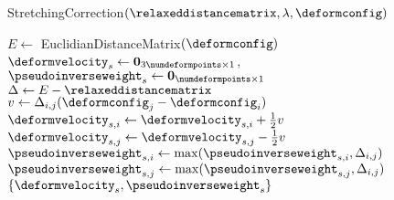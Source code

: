 \begin{algorithm}[t]
    \caption{StretchingCorrection$(\relaxeddistancematrix, \lambda, \deformconfig)$}
    \begin{algorithmic}[1]
        \State $E \gets$ EuclidianDistanceMatrix$(\deformconfig)$
        \State $\deformvelocity_s \gets \boldsymbol 0_{3\numdeformpoints \times 1}$, $\pseudoinverseweight_s \gets \boldsymbol 0_{\numdeformpoints \times 1}$
        \State $\Delta \gets E - \relaxeddistancematrix$
                    \State $v \gets \Delta_{i,j}(\deformconfig_j - \deformconfig_i)$
                    \State $\deformvelocity_{s,i} \gets \deformvelocity_{s,i} + \frac{1}{2}v$
                    \State $\deformvelocity_{s,j} \gets \deformvelocity_{s,j} - \frac{1}{2}v$
                    \State $\pseudoinverseweight_{s,i} \gets \max (\pseudoinverseweight_{s,i}, \Delta_{i,j})$
                    \State $\pseudoinverseweight_{s,j} \gets \max (\pseudoinverseweight_{s,j}, \Delta_{i,j})$
                \EndIf
            \EndFor
        \EndFor
        \State \Return $\{ \deformvelocity_s, \pseudoinverseweight_s \}$
    \end{algorithmic}
    \label{alg:stretching_correction}
\end{algorithm}